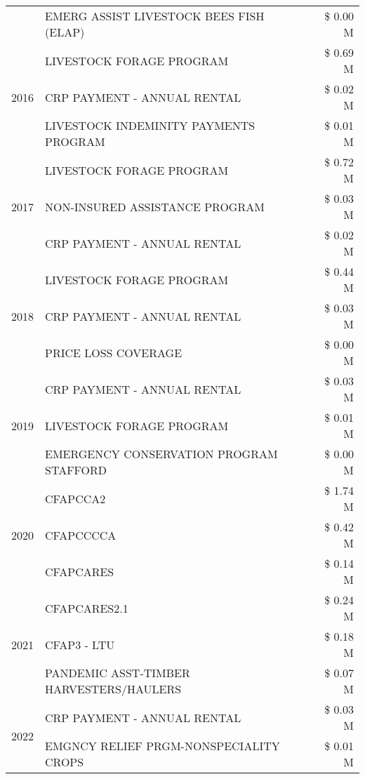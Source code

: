 \begin{tabular}{llr}
 & EMERG ASSIST LIVESTOCK BEES FISH (ELAP) & \$ 0.00 M \\
\cline{1-3}
\multirow[t]{3}{*}{2016} & LIVESTOCK FORAGE PROGRAM & \$ 0.69 M \\
 & CRP PAYMENT - ANNUAL RENTAL & \$ 0.02 M \\
 & LIVESTOCK INDEMINITY PAYMENTS PROGRAM & \$ 0.01 M \\
\cline{1-3}
\multirow[t]{3}{*}{2017} & LIVESTOCK FORAGE PROGRAM & \$ 0.72 M \\
 & NON-INSURED ASSISTANCE PROGRAM & \$ 0.03 M \\
 & CRP PAYMENT - ANNUAL RENTAL & \$ 0.02 M \\
\cline{1-3}
\multirow[t]{3}{*}{2018} & LIVESTOCK FORAGE PROGRAM & \$ 0.44 M \\
 & CRP PAYMENT - ANNUAL RENTAL & \$ 0.03 M \\
 & PRICE LOSS COVERAGE & \$ 0.00 M \\
\cline{1-3}
\multirow[t]{3}{*}{2019} & CRP PAYMENT - ANNUAL RENTAL & \$ 0.03 M \\
 & LIVESTOCK FORAGE PROGRAM & \$ 0.01 M \\
 & EMERGENCY CONSERVATION PROGRAM STAFFORD & \$ 0.00 M \\
\cline{1-3}
\multirow[t]{3}{*}{2020} & CFAPCCA2 & \$ 1.74 M \\
 & CFAPCCCCA & \$ 0.42 M \\
 & CFAPCARES & \$ 0.14 M \\
\cline{1-3}
\multirow[t]{3}{*}{2021} & CFAPCARES2.1 & \$ 0.24 M \\
 & CFAP3 - LTU & \$ 0.18 M \\
 & PANDEMIC ASST-TIMBER HARVESTERS/HAULERS & \$ 0.07 M \\
\cline{1-3}
\multirow[t]{2}{*}{2022} & CRP PAYMENT - ANNUAL RENTAL & \$ 0.03 M \\
 & EMGNCY RELIEF PRGM-NONSPECIALITY CROPS & \$ 0.01 M \\
\cline{1-3}
\bottomrule
\end{tabular}

